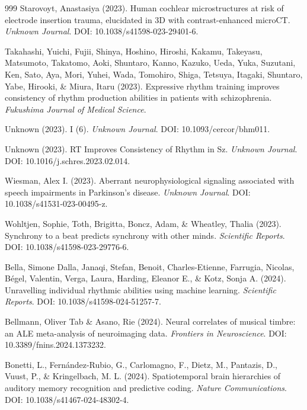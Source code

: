 \documentclass[9pt,onecolumn]{article}
\begin{document}
\begin{thebibliography}{999}
Starovoyt, Anastasiya (2023). Human cochlear microstructures at risk of electrode insertion trauma, elucidated in 3D with contrast-enhanced microCT. \textit{Unknown Journal}. DOI: 10.1038/s41598-023-29401-6.

Takahashi, Yuichi, Fujii, Shinya, Hoshino, Hiroshi, Kakamu, Takeyasu, Matsumoto, Takatomo, Aoki, Shuntaro, Kanno, Kazuko, Ueda, Yuka, Suzutani, Ken, Sato, Aya, Mori, Yuhei, Wada, Tomohiro, Shiga, Tetsuya, Itagaki, Shuntaro, Yabe, Hirooki, \& Miura, Itaru (2023). Expressive rhythm training improves consistency of rhythm production abilities in patients with schizophrenia. \textit{Fukushima Journal of Medical Science}.

Unknown (2023). I (6). \textit{Unknown Journal}. DOI: 10.1093/cercor/bhm011.

Unknown (2023). RT Improves Consistency of Rhythm in Sz. \textit{Unknown Journal}. DOI: 10.1016/j.schres.2023.02.014.

Wiesman, Alex I. (2023). Aberrant neurophysiological signaling associated with speech impairments in Parkinson’s disease. \textit{Unknown Journal}. DOI: 10.1038/s41531-023-00495-z.

Wohltjen, Sophie, Toth, Brigitta, Boncz, Adam, \& Wheatley, Thalia (2023). Synchrony to a beat predicts synchrony with other minds. \textit{Scientific Reports}. DOI: 10.1038/s41598-023-29776-6.

Bella, Simone Dalla, Janaqi, Stefan, Benoit, Charles-Etienne, Farrugia, Nicolas, Bégel, Valentin, Verga, Laura, Harding, Eleanor E., \& Kotz, Sonja A. (2024). Unravelling individual rhythmic abilities using machine learning. \textit{Scientific Reports}. DOI: 10.1038/s41598-024-51257-7.

Bellmann, Oliver Tab \& Asano, Rie (2024). Neural correlates of musical timbre: an ALE meta-analysis of neuroimaging data. \textit{Frontiers in Neuroscience}. DOI: 10.3389/fnins.2024.1373232.

Bonetti, L., Fernández-Rubio, G., Carlomagno, F., Dietz, M., Pantazis, D., Vuust, P., \& Kringelbach, M. L. (2024). Spatiotemporal brain hierarchies of auditory memory recognition and predictive coding. \textit{Nature Communications}. DOI: 10.1038/s41467-024-48302-4.


\end{thebibliography}
\end{document}
